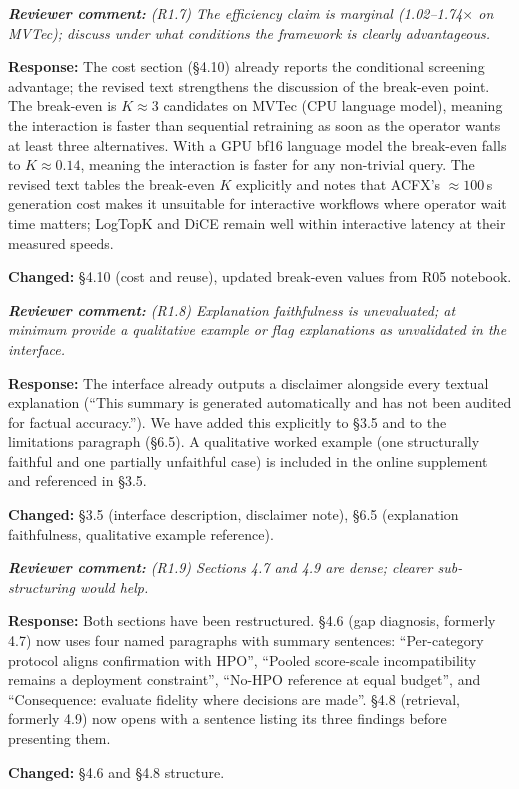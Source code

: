 \documentclass[11pt,a4paper]{article}
\newcommand{\revquote}[1]{\smallskip\noindent\textit{\textbf{Reviewer comment:} #1}\smallskip}
\newcommand{\response}[1]{\noindent\textbf{Response:} #1\par}
\begin{document}
\bigskip

\revquote{(R1.7) The efficiency claim is marginal (1.02--1.74$\times$ on
MVTec); discuss under what conditions the framework is clearly
advantageous.}

\response{The cost section (\S4.10) already reports the conditional
screening advantage; the revised text strengthens the discussion of the
break-even point. The break-even is $K \approx 3$ candidates on MVTec
(CPU language model), meaning the interaction is faster than sequential
retraining as soon as the operator wants at least three alternatives.
With a GPU bf16 language model the break-even falls to $K \approx 0.14$,
meaning the interaction is faster for any non-trivial query. The
revised text tables the break-even $K$ explicitly and notes that ACFX's
$\approx 100$\,s generation cost makes it unsuitable for interactive
workflows where operator wait time matters; LogTopK and DiCE remain
well within interactive latency at their measured speeds.

\noindent\textbf{Changed:} \S4.10 (cost and reuse), updated break-even
values from R05 notebook.}

\bigskip

\revquote{(R1.8) Explanation faithfulness is unevaluated; at minimum provide
a qualitative example or flag explanations as unvalidated in the
interface.}

\response{The interface already outputs a disclaimer alongside every
textual explanation (``This summary is generated automatically and
has not been audited for factual accuracy.''). We have added this
explicitly to \S3.5 and to the limitations paragraph (\S6.5).
A qualitative worked example (one structurally faithful and one
partially unfaithful case) is included in the online supplement and
referenced in \S3.5.

\noindent\textbf{Changed:} \S3.5 (interface description, disclaimer
note), \S6.5 (explanation faithfulness, qualitative example reference).}

\bigskip

\revquote{(R1.9) Sections 4.7 and 4.9 are dense; clearer sub-structuring
would help.}

\response{Both sections have been restructured. \S4.6 (gap diagnosis,
formerly 4.7) now uses four named paragraphs with summary sentences:
``Per-category protocol aligns confirmation with HPO'',
``Pooled score-scale incompatibility remains a deployment constraint'',
``No-HPO reference at equal budget'', and
``Consequence: evaluate fidelity where decisions are made''.
\S4.8 (retrieval, formerly 4.9) now opens with a sentence listing its
three findings before presenting them.

\noindent\textbf{Changed:} \S4.6 and \S4.8 structure.}
\end{document}
